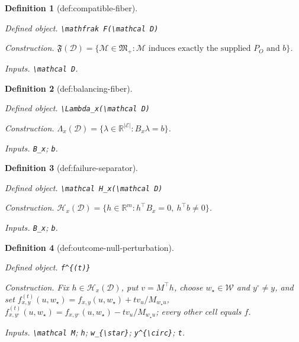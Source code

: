 \documentclass{article}
\newtheorem{definition}{Definition}
\begin{document}
\begin{definition}[def:compatible-fiber]\label{def:compatible-fiber}
\par\smallskip\noindent\emph{Defined object.} \texttt{\textbackslash{}\allowbreak{}mathfrak F(\textbackslash{}\allowbreak{}mathcal D)}
\par\smallskip\noindent\emph{Construction.} \(\mathfrak F(\mathcal D)=\{\mathcal M\in\mathfrak M_{+}:\mathcal M\text{ induces exactly the supplied }P_O\text{ and }b\}\).
\par\smallskip\noindent\emph{Inputs.} \texttt{\textbackslash{}\allowbreak{}mathcal D}.
\end{definition}

\begin{definition}[def:balancing-fiber]\label{def:balancing-fiber}
\par\smallskip\noindent\emph{Defined object.} \texttt{\textbackslash{}\allowbreak{}Lambda\_\allowbreak{}x(\textbackslash{}\allowbreak{}mathcal D)}
\par\smallskip\noindent\emph{Construction.} \(\Lambda_x(\mathcal D)=\{\lambda\in\mathbb R^{\lvert\mathcal E\rvert}:B_x\lambda=b\}\).
\par\smallskip\noindent\emph{Inputs.} \texttt{B\_\allowbreak{}x}; \texttt{b}.
\end{definition}

\begin{definition}[def:failure-separator]\label{def:failure-separator}
\par\smallskip\noindent\emph{Defined object.} \texttt{\textbackslash{}\allowbreak{}mathcal H\_\allowbreak{}x(\textbackslash{}\allowbreak{}mathcal D)}
\par\smallskip\noindent\emph{Construction.} \(\mathcal H_x(\mathcal D)=\{h\in\mathbb R^m:h^{\top}B_x=0,\ h^{\top}b\ne0\}\).
\par\smallskip\noindent\emph{Inputs.} \texttt{B\_\allowbreak{}x}; \texttt{b}.
\end{definition}

\begin{definition}[def:outcome-null-perturbation]\label{def:outcome-null-perturbation}
\par\smallskip\noindent\emph{Defined object.} \texttt{f\textasciicircum{}\{(t)\}\allowbreak{}}
\par\smallskip\noindent\emph{Construction.} Fix \(h\in\mathcal H_x(\mathcal D)\), put \(v=M^{\top}h\), choose \(w_{\star}\in\mathcal W\) and \(y^{\circ}\ne y\), and set \(f^{(t)}_{x,y}(u,w_{\star})=f_{x,y}(u,w_{\star})+t v_u/M_{w_{\star}u}\), \(f^{(t)}_{x,y^{\circ}}(u,w_{\star})=f_{x,y^{\circ}}(u,w_{\star})-t v_u/M_{w_{\star}u}\); every other cell equals \(f\).
\par\smallskip\noindent\emph{Inputs.} \texttt{\textbackslash{}\allowbreak{}mathcal M}; \texttt{h}; \texttt{w\_\allowbreak{}\{\textbackslash{}\allowbreak{}star\}\allowbreak{}}; \texttt{y\textasciicircum{}\{\textbackslash{}\allowbreak{}circ\}\allowbreak{}}; \texttt{t}.
\end{definition}
\end{document}
